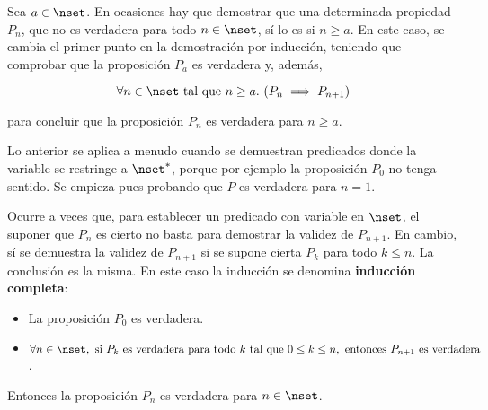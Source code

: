 Sea $a \in \nset$. En ocasiones hay que demostrar que una determinada
propiedad $P_n$, que no es verdadera para todo $n \in \nset$, sí lo es si $n
\geq a$. En este caso, se cambia el primer punto en la demostración por
inducción, teniendo que comprobar que la proposición $P_a$ es verdadera y,
además,

\[ \forall n \in \nset \text{ tal que } n \geq a.\ (P_n \implies P_{n+1}) \]

\noindent para concluir que la proposición $P_n$ es verdadera para $n \geq
a$.

Lo anterior se aplica a menudo cuando se demuestran predicados donde la
variable se restringe a $\nset^*$, porque por ejemplo la
proposición $P_0$ no tenga sentido. Se empieza pues probando que $P$
es verdadera para $n = 1$.

Ocurre a veces que, para establecer un predicado con variable en $\nset$, el
suponer que $P_n$ es cierto no basta para demostrar la validez de $P_{n+1}$.
En cambio, sí se demuestra la validez de $P_{n+1}$ si se supone cierta $P_k$
para todo $k \leq n$. La conclusión es la misma. En este caso la inducción
se denomina \textbf{inducción completa}:

\begin{itemize}
  \item La proposición $P_0$ es verdadera.
  \item $\forall n \in \nset, \text{ si } P_k \text{ es verdadera para todo
    } k \text{ tal que } 0 \leq k \leq n, \text{ entonces } P_{n+1} \text{
      es verdadera}$.
\end{itemize}

Entonces la proposición $P_n$ es verdadera para $n \in \nset$.













